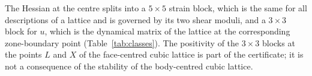 \begin{remark}\label{rem:optical}
The Hessian at the centre splits into a $5\times5$ strain block, which is the same for all descriptions of a lattice and is governed
by its two shear moduli, and a $3\times3$ block for $u$, which is the dynamical matrix of the lattice at the corresponding
zone-boundary point (Table~\ref{tab:classes}). The positivity of the $3\times3$ blocks at the points $L$ and $X$ of the face-centred
cubic lattice is part of the certificate; it is not a consequence of the stability of the body-centred cubic lattice.
\end{remark}
